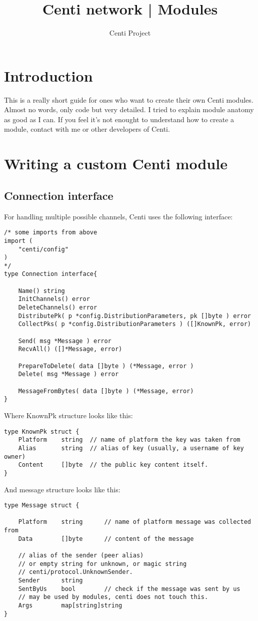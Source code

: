 \documentclass{article}
\title{Centi network | Modules}
\author{Centi Project}
\begin{document}
\maketitle
\newpage
\tableofcontents
\newpage

\section{Introduction}
	This is a really short guide for ones who want to create their own Centi modules.
	Almost no words, only code but very detailed. I tried to explain module anatomy as
	good as I can. If you feel it's not enought to understand how to create a module,
	contact with me or other developers of Centi.

\section{Writing a custom Centi module}
	\subsection{Connection interface}
	For handling multiple possible channels, Centi uses the following interface:
	\begin{lstlisting}
/* some imports from above
import (
	"centi/config"
)
*/
type Connection interface{

	Name() string
	InitChannels() error
	DeleteChannels() error
	DistributePk( p *config.DistributionParameters, pk []byte ) error
	CollectPks( p *config.DistributionParameters ) ([]KnownPk, error)

	Send( msg *Message ) error
	RecvAll() ([]*Message, error)

	PrepareToDelete( data []byte ) (*Message, error )
	Delete( msg *Message ) error

	MessageFromBytes( data []byte ) (*Message, error)
}
	\end{lstlisting}
	
	Where KnownPk structure looks like this:
	\begin{lstlisting}
type KnownPk struct {
	Platform	string	// name of platform the key was taken from
	Alias		string	// alias of key (usually, a username of key owner)
	Content		[]byte	// the public key content itself.
}
	\end{lstlisting}

	And message structure looks like this:
	\begin{lstlisting}
type Message struct {

	Platform	string		// name of platform message was collected from
	Data		[]byte		// content of the message

	// alias of the sender (peer alias)
	// or empty string for unknown, or magic string
	// centi/protocol.UnknownSender.
	Sender		string
	SentByUs	bool		// check if the message was sent by us
	// may be used by modules, centi does not touch this.
	Args		map[string]string
}
	\end{lstlisting}
\end{document}
